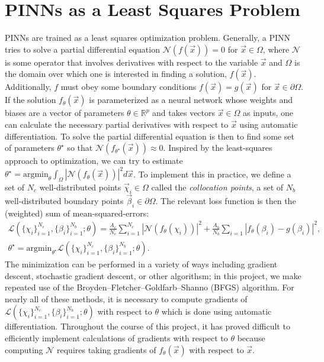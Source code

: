 \documentclass[11pt]{article}
\newcommand{\R}{\mathbb R}
\newcommand{\1}{\mathbf 1}
\begin{document}
\section{PINNs as a Least Squares Problem}

PINNs are trained as a least squares optimization problem.
Generally, a PINN tries to solve a partial differential equation $\mathcal{N}(f(\vec x)) = 0$ for $\vec x \in \Omega$, where $\mathcal{N}$ is some operator that involves derivatives with respect to the variable $\vec x$ and $\Omega$ is the domain over which one is interested in finding a solution, $f(\vec x)$.
Additionally, $f$ must obey some boundary conditions $f(\vec x) = g(\vec x)$ for $\vec x \in \partial \Omega$.
If the solution $f_{\theta}(\vec x)$ is parameterized as a neural network whose weights and biases are a vector of parameters $\theta \in \R^p$ and takes vectors $\vec x \in \Omega$ as inputs, one can calculate the necessary partial derivatives with respect to $\vec x$ using automatic differentiation.
To solve the partial differential equation is then to find some set of parameters $\theta^\star$ so that $\mathcal{N}(f_{\theta^\star} (\vec x)) \approx 0$.
Inspired by the least-squares approach to optimization, we can try to estimate $\theta^\star = \mathrm{argmin}_{\theta} \int_{\Omega}|\mathcal{N}(f_\theta(\vec x))|^2 d\vec x$.
To implement this in practice, we define a set of $N_c$ well-distributed points $\vec \chi_i \in \Omega$ called the {\em collocation points}, a set of $N_b$ well-distributed boundary points $\vec \beta_i \in \partial \Omega$.
The relevant loss function is then the (weighted) sum of mean-squared-errors:
\begin{gather}
	\mathcal{L} ( \{\chi_i\}_{i=1}^{N_c}, \{\beta_i\}_{i=1}^{N_b} ; \theta )=
	\frac{A_c}{N_c} \sum_{i=1}^{N_c} |\mathcal{N}(f_\theta(\chi_i))|^2
	+
	\frac{A_b}{N_b}
	\sum_{i=1} |f_\theta(\beta_i) - g(\beta_i)|^2,
	\\
	\theta^\star = \mathrm{argmin}_{\theta^\star} 
	\mathcal{L} ( \{\chi_i\}_{i=1}^{N_c}, \{\beta_i\}_{i=1}^{N_b};\theta).
\end{gather}
The minimization can be performed in a variety of ways including gradient descent, stochastic gradient descent, or other algorithsm; in this project, we make repeated use of the Broyden–Fletcher–Goldfarb–Shanno (BFGS) algorithm.
For nearly all of these methods, it is necessary to compute gradients of $\mathcal{L} ( \{\chi_i\}_{i=1}^{N_c}, \{\beta_i\}_{i=1}^{N_b};\theta)$ with respect to $\theta$ which is done using automatic differentiation.
Throughout the course of this project, it has proved difficult to efficiently implement calculations of gradients with respect to $\theta$ because computing $\mathcal{N}$ requires taking gradients of $f_\theta(\vec x)$ with respect to $\vec x$.
\end{document}
